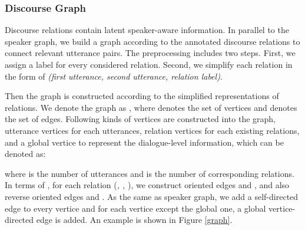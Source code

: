 \documentclass[letterpaper]{article} \usepackage{stylefile}  \usepackage{times}  \usepackage{helvet}  \usepackage{courier}  \usepackage[hyphens]{url}  \usepackage{graphicx} \urlstyle{rm} \def\UrlFont{\rm}  \usepackage{natbib}  \usepackage{caption} \DeclareCaptionStyle{ruled}{labelfont=normalfont,labelsep=colon,strut=off} \frenchspacing  \setlength{\pdfpagewidth}{8.5in}  \setlength{\pdfpageheight}{11in}  \usepackage{algorithm}
\begin{document}
\subsubsection{Discourse Graph}
Discourse relations contain latent speaker-aware information. 
In parallel to the speaker graph, we build a graph according to the annotated discourse relations to connect relevant utterance pairs. The preprocessing includes two steps. First, we assign a label for every considered relation. Second, we simplify each relation in the form of \emph{(first utterance, second utterance, relation label)}.

Then the graph is constructed according to the simplified representations of relations. We denote the graph as , where  denotes the set of vertices and  denotes the set of edges. Following kinds of vertices are constructed into the graph, utterance vertices for each utterances, relation vertices for each existing relations, and a global vertice to represent the dialogue-level information, which can be denoted as:

where  is the number of utterances and  is the number of corresponding relations. In terms of , for each relation (\emph{, , }), we construct oriented edges  and , and also reverse oriented edges  and . As the same as speaker graph, we add a self-directed edge   to every vertice and for each vertice except the global one, a global vertice-directed edge  is added. An example is shown in Figure \ref{graph}.
\end{document}
